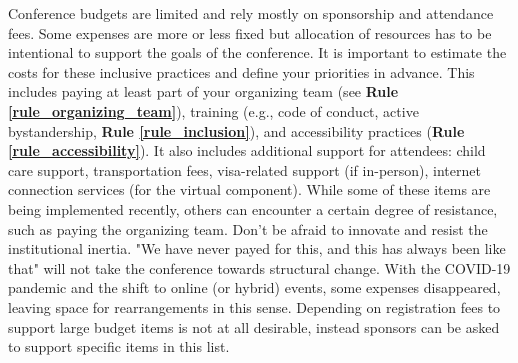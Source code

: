 \documentclass[10pt,letterpaper]{article}
\begin{document}
Conference budgets are limited and rely mostly on sponsorship and attendance fees. Some expenses are more or less fixed but allocation of resources has to be intentional to support the goals of the conference. It is important to estimate the costs for these inclusive practices and define your priorities in advance. This includes paying at least part of your organizing team (see \textbf{Rule \ref{rule_organizing_team}}), training (e.g., code of conduct, active bystandership, \textbf{Rule \ref{rule_inclusion}}), and accessibility practices (\textbf{Rule \ref{rule_accessibility}}). It also includes additional support for attendees: child care support, transportation fees, visa-related support (if in-person), internet connection services (for the virtual component). While some of these items are being implemented recently, others can encounter a certain degree of resistance, such as paying the organizing team. Don't be afraid to innovate and resist the institutional inertia. "We have never payed for this, and this has always been like that" will not take the conference towards structural change.
With the COVID-19 pandemic and the shift to online (or hybrid) events, some expenses disappeared, leaving space for rearrangements in this sense.
Depending on registration fees to support large budget items is not at all desirable, instead sponsors can be asked to support specific items in this list.
\end{document}
